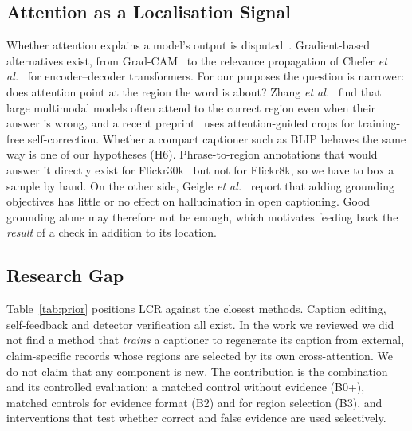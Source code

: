 \subsection{Attention as a Localisation Signal}
Whether attention explains a model's output is disputed~\cite{jain2019attention}. Gradient-based alternatives exist, from Grad-CAM~\cite{selvaraju2017grad} to the relevance propagation of Chefer \emph{et al.}~\cite{chefer2021generic} for encoder--decoder transformers. For our purposes the question is narrower: does attention point at the region the word is about? Zhang \emph{et al.}~\cite{zhang2025mllms} find that large multimodal models often attend to the correct region even when their answer is wrong, and a recent preprint~\cite{sanogo2025toward} uses attention-guided crops for training-free self-correction. Whether a compact captioner such as BLIP behaves the same way is one of our hypotheses (H6). Phrase-to-region annotations that would answer it directly exist for Flickr30k~\cite{plummer2015flickr30k} but not for Flickr8k, so we have to box a sample by hand. On the other side, Geigle \emph{et al.}~\cite{geigle2024does} report that adding grounding objectives has little or no effect on hallucination in open captioning. Good grounding alone may therefore not be enough, which motivates feeding back the \emph{result} of a check in addition to its location.

\subsection{Research Gap}
Table~\ref{tab:prior} positions LCR against the closest methods. Caption editing, self-feedback and detector verification all exist. In the work we reviewed we did not find a method that \emph{trains} a captioner to regenerate its caption from external, claim-specific records whose regions are selected by its own cross-attention. We do not claim that any component is new. The contribution is the combination and its controlled evaluation: a matched control without evidence (B0+), matched controls for evidence format (B2) and for region selection (B3), and interventions that test whether correct and false evidence are used selectively.

